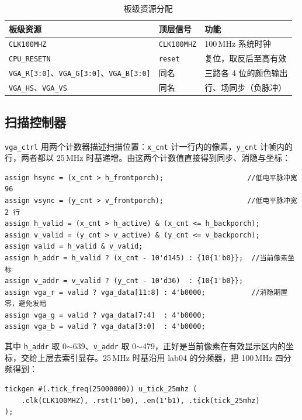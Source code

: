 \documentclass[12pt, a4paper]{ctexart}
\begin{document}
\begin{table}[htbp]
    \centering
    \caption{板级资源分配}
    \label{tab:io}
    \begin{tabular}{lll}
        \hline
        板级资源 & 顶层信号 & 功能 \\
        \hline
        \texttt{CLK100MHZ} & \texttt{CLK100MHZ} & 100\,MHz 系统时钟 \\
        \texttt{CPU\_RESETN} & \texttt{reset} & 复位，取反后至高有效 \\
        \texttt{VGA\_R[3:0]}、\texttt{VGA\_G[3:0]}、\texttt{VGA\_B[3:0]} & 同名 & 三路各 4 位的颜色输出 \\
        \texttt{VGA\_HS}、\texttt{VGA\_VS} & 同名 & 行、场同步（负脉冲）\\
        \hline
    \end{tabular}
\end{table}

\subsection{扫描控制器}
\texttt{vga\_ctrl} 用两个计数器描述扫描位置：\texttt{x\_cnt} 计一行内的像素，\texttt{y\_cnt} 计帧内的行，两者都以 25\,MHz 时基递增。由这两个计数值直接得到同步、消隐与坐标：

\begin{lstlisting}
assign hsync = (x_cnt > h_frontporch);                    //低电平脉冲宽 96
assign vsync = (y_cnt > v_frontporch);                    //低电平脉冲宽 2 行
assign h_valid = (x_cnt > h_active) & (x_cnt <= h_backporch);
assign v_valid = (y_cnt > v_active) & (y_cnt <= v_backporch);
assign valid = h_valid & v_valid;
assign h_addr = h_valid ? (x_cnt - 10'd145) : {10{1'b0}};  //当前像素坐标
assign v_addr = v_valid ? (y_cnt - 10'd36)  : {10{1'b0}};
assign vga_r = valid ? vga_data[11:8] : 4'b0000;           //消隐期置零，避免发暗
assign vga_g = valid ? vga_data[7:4]  : 4'b0000;
assign vga_b = valid ? vga_data[3:0]  : 4'b0000;
\end{lstlisting}

\noindent 其中 \texttt{h\_addr} 取 0$\sim$639、\texttt{v\_addr} 取 0$\sim$479，正好是当前像素在有效显示区内的坐标，交给上层去索引显存。25\,MHz 时基沿用 lab04 的分频器，把 100\,MHz 四分频得到：

\begin{lstlisting}
tickgen #(.tick_freq(25000000)) u_tick_25mhz (
    .clk(CLK100MHZ), .rst(1'b0), .en(1'b1), .tick(tick_25mhz)
);
\end{lstlisting}
\end{document}
